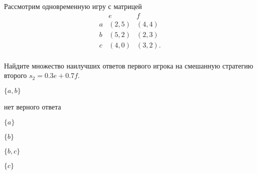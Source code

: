 
\begin{question}
Рассмотрим одновременную игру с матрицей \[
\begin{matrix}
   & e & f \\
a  & (2, 5) & (4, 4) \\
b  & (5, 2) & (2, 3) \\ 
c  & (4, 0) & (3, 2). \\ 
\end{matrix}
\]

Найдите множество наилучших ответов первого игрока на смешанную
стратегию второго \(s_2 = 0.3e + 0.7f\).
\begin{answerlist}
  \item \(\{a, b\}\)
  \item нет верного ответа
  \item \(\{a\}\)
  \item \(\{b\}\)
  \item \(\{b, c\}\)
  \item \(\{c\}\)
\end{answerlist}
\end{question}


